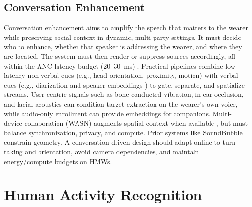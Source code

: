 \subsection{Conversation Enhancement}
Conversation enhancement aims to amplify the speech that matters to the wearer while preserving social context in dynamic, multi-party settings. It must decide who to enhance, whether that speaker is addressing the wearer, and where they are located. The system must then render or suppress sources accordingly, all within the ANC latency budget (\mbox{20–30 ms}) \cite{stone1999tolerable, gupta2020acoustic}. Practical pipelines combine low-latency non-verbal cues (e.g., head orientation, proximity, motion) with verbal cues (e.g., diarization and speaker embeddings \cite{bredin2023pyannote, zmolikova2023neural, veluri2024look}) to gate, separate, and spatialize streams. User-centric signals such as bone-conducted vibration, in-ear occlusion, and facial acoustics \cite{he2023towards, han2024earspeech, zhang2025wearse} can condition target extraction on the wearer's own voice, while audio-only enrollment can provide embeddings for companions. Multi-device collaboration (WASN) augments spatial context when available \cite{gburrek2021geometry}, but must balance synchronization, privacy, and compute. Prior systems like SoundBubble \cite{chen2024hearable} constrain geometry. A conversation-driven design should adapt online to turn-taking and orientation, avoid camera dependencies, and maintain energy/compute budgets on HMWs.

\section{Human Activity Recognition}

